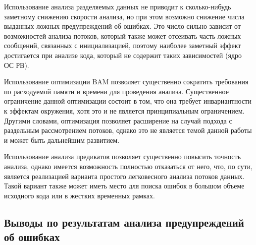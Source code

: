 Использование анализа разделяемых данных не приводит к сколько-нибудь заметному снижению скорости анализа, но при этом возможно снижение числа выданных ложных предупреждений об ошибках. 
Это число сильно зависит от возможностей анализа потоков, который также может отсеивать часть ложных сообщений, связанных с инициализацией, поэтому наиболее заметный эффект достигается при анализе кода, который не содержит таких зависимостей (ядро ОС РВ).

Использование оптимизации BAM позволяет существенно сократить требования по расходуемой памяти и времени для проведения анализа.
Существенное ограничение данной оптимизации состоит в том, что она требует инвариантности к эффектам окружения, хотя это и не является принципиальным ограничением.
Другими словами, оптимизация позволяет расширение на случай подхода с раздельным рассмотрением потоков, однако это не является темой данной работы и может быть дальнейшим развитием.

Использование анализа предикатов позволяет существенно повысить точность анализа, однако имеется возможность полностью отказаться от него, что, по сути, является реализацией варианта простого легковесного анализа потоков данных. 
Такой вариант также может иметь место для поиска ошибок в большом объеме исходного кода или в жестких временных рамках.

\subsection{Выводы по результатам анализа предупреждений об ошибках}



\clearpage